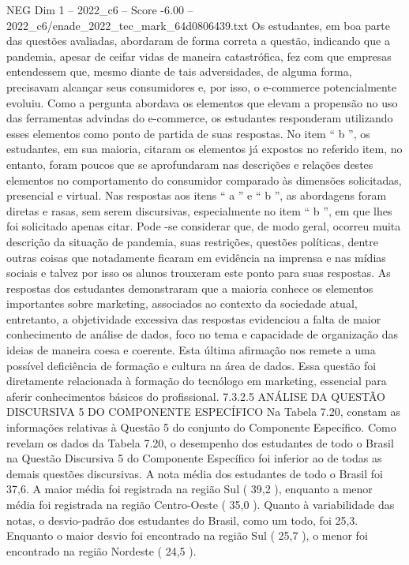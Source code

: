 \begin{textsample}{NEG Dim 1 – 2022\_c6 – Score -6.00 – 2022\_c6/enade\_2022\_tec\_mark\_64d0806439.txt}
Os estudantes, em boa parte das questões avaliadas, abordaram de forma correta a questão, indicando que a pandemia, apesar de ceifar vidas de maneira catastrófica, fez com que empresas entendessem que, mesmo diante de tais adversidades, de alguma forma, precisavam alcançar seus consumidores e, por isso, o e-commerce potencialmente evoluiu.
Como a pergunta abordava os elementos que elevam a propensão no uso das ferramentas advindas do e-commerce, os estudantes responderam utilizando esses elementos como ponto de partida de suas respostas.
No item “ b ”, os estudantes, em sua maioria, citaram os elementos já expostos no referido item, no entanto, foram poucos que se aprofundaram nas descrições e relações destes elementos no comportamento do consumidor comparado às dimensões solicitadas, presencial e virtual.
Nas respostas aos itens “ a ” e “ b ”, as abordagens foram diretas e rasas, sem serem discursivas, especialmente no item “ b ”, em que lhes foi solicitado apenas citar.
Pode -se considerar que, de modo geral, ocorreu muita descrição da situação de pandemia, suas restrições, questões políticas, dentre outras coisas que notadamente ficaram em evidência na imprensa e nas mídias sociais e talvez por isso os alunos trouxeram este ponto para suas respostas.
As respostas dos estudantes demonstraram que a maioria conhece os elementos importantes sobre marketing, associados ao contexto da sociedade atual, entretanto, a objetividade excessiva das respostas evidenciou a falta de maior conhecimento de análise de dados, foco no tema e capacidade de organização das ideias de maneira coesa e coerente.
Esta última afirmação nos remete a uma possível deficiência de formação e cultura na área de dados.
Essa questão foi diretamente relacionada à formação do tecnólogo em marketing, essencial para aferir conhecimentos básicos do profissional. 7.3.2.5 ANÁLISE DA QUESTÃO DISCURSIVA 5 DO COMPONENTE ESPECÍFICO Na Tabela 7.20, constam as informações relativas à Questão 5 do conjunto do Componente Específico.
Como revelam os dados da Tabela 7.20, o desempenho dos estudantes de todo o Brasil na Questão Discursiva 5 do Componente Específico foi inferior ao de todas as demais questões discursivas.
A nota média dos estudantes de todo o Brasil foi 37,6.
A maior média foi registrada na região Sul ( 39,2 ), enquanto a menor média foi registrada na região Centro-Oeste ( 35,0 ).
Quanto à variabilidade das notas, o desvio-padrão dos estudantes do Brasil, como um todo, foi 25,3.
Enquanto o maior desvio foi encontrado na região Sul ( 25,7 ), o menor foi encontrado na região Nordeste ( 24,5 ).

\end{textsample}

